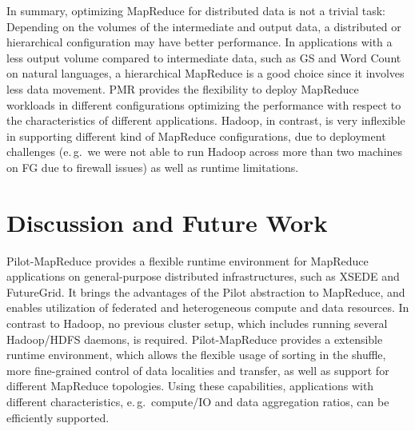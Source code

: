 \documentclass{acm_proc_article-sp}
\newcommand{\alnote}[1]{ {\textcolor{blue} { ***andreL: #1 }}}
\newcommand{\alnote}[1]{}
\newcommand{\upp}{\vspace*{-0.5em}}
\newcommand{\pilotmapreduce}{Pilot-MapReduce\xspace}
\begin{document}
In summary, optimizing MapReduce for distributed data is not a trivial
task: 
Depending on the volumes of the intermediate and output data, a distributed or
hierarchical configuration may have better performance. In applications with a
less output volume compared to intermediate data, such as GS and Word Count on
natural languages, a hierarchical MapReduce is a good choice since it involves
less data movement. PMR provides the flexibility to deploy MapReduce workloads
in different configurations optimizing the performance with respect to the
characteristics of different applications. Hadoop, in contrast, is very
inflexible in supporting different kind of MapReduce configurations, due to
deployment challenges (e.\,g.\ we were not able to run Hadoop across more than
two machines on FG due to firewall issues) as well as runtime limitations.

\upp\upp
\section{Discussion and Future Work}
\label{sec-conclusion}

\pilotmapreduce provides a flexible runtime environment for MapReduce
applications on general-purpose distributed infrastructures, such as XSEDE and
FutureGrid. It brings the advantages of the Pilot abstraction to MapReduce, and
enables utilization of federated and heterogeneous compute and data resources.
In contrast to Hadoop, no previous cluster setup, which includes running several
Hadoop/HDFS daemons, is required. Pilot-MapReduce provides a extensible runtime
environment, which allows the flexible usage of sorting in the shuffle, more
fine-grained control of data localities and transfer, as well as support for
different MapReduce topologies. Using these capabilities, applications with
different characteristics, e.\,g.\ compute/IO and data aggregation ratios, can
be efficiently supported. 

\end{document}
